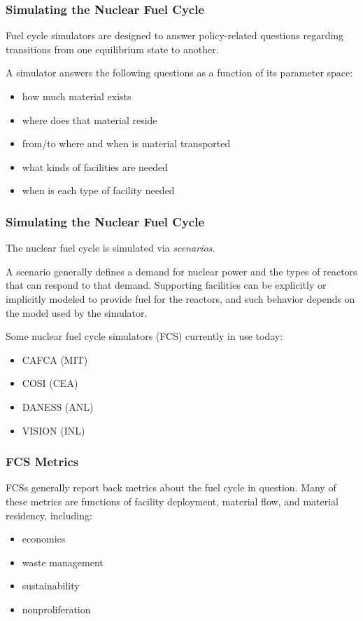 
\begin{frame}[ctb!]
  \frametitle{Simulating the Nuclear Fuel Cycle} 

  Fuel cycle simulators are designed to answer policy-related questions
  regarding transitions from one equilibrium state to another.

  \vspace{0.2cm}

  \pause
  A simulator answers the following questions as a function of its 
  parameter space:
  \begin{itemize}
    \item how much material exists
    \item where does that material reside
    \item from/to where and when is material transported
    \item what kinds of facilities are needed
    \item when is each type of facility needed
  \end{itemize}
\end{frame}

\begin{frame}[ctb!]
  \frametitle{Simulating the Nuclear Fuel Cycle}
  The nuclear fuel cycle is simulated via \textit{scenarios}.\vspace{0.2cm}

  A scenario generally defines a demand for nuclear power and the types of
  reactors that can respond to that demand. Supporting facilities can be
  explicitly or implicitly modeled to provide fuel for the reactors, and such
  behavior depends on the model used by the simulator.\vspace{0.2cm}

  Some nuclear fuel cycle simulators (FCS) currently in use today:
  \begin{itemize}
    \item CAFCA (MIT) \cite{busquim_e_silva_system_2008}
    \item COSI (CEA) \cite{boucher_cosi:_2006}
    \item DANESS (ANL) \cite{durpel_daness_2003}
    \item VISION (INL) \cite{yacout_vision_2006}
  \end{itemize}
\end{frame}

\begin{frame}[ctb!]
  \frametitle{FCS Metrics}

  FCSs generally report back metrics about the fuel cycle in question. Many of
  these metrics are functions of facility deployment, material flow, and
  material residency, including:

  \begin{itemize}
    \item economics
    \item waste management
    \item sustainability
    \item nonproliferation
  \end{itemize}
\end{frame}

